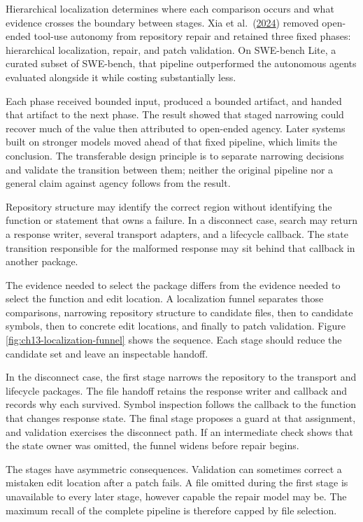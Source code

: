 Hierarchical localization determines where each comparison occurs and what evidence crosses the boundary between stages. Xia et al.~(\href{https://arxiv.org/abs/2407.01489}{2024}) removed open-ended tool-use autonomy from repository repair and retained three fixed phases: hierarchical localization, repair, and patch validation. On SWE-bench Lite, a curated subset of SWE-bench, that pipeline outperformed the autonomous agents evaluated alongside it while costing substantially less.

Each phase received bounded input, produced a bounded artifact, and handed that artifact to the next phase. The result showed that staged narrowing could recover much of the value then attributed to open-ended agency. Later systems built on stronger models moved ahead of that fixed pipeline, which limits the conclusion. The transferable design principle is to separate narrowing decisions and validate the transition between them; neither the original pipeline nor a general claim against agency follows from the result.

Repository structure may identify the correct region without identifying the function or statement that owns a failure. In a disconnect case, search may return a response writer, several transport adapters, and a lifecycle callback. The state transition responsible for the malformed response may sit behind that callback in another package.

The evidence needed to select the package differs from the evidence needed to select the function and edit location. A localization funnel separates those comparisons, narrowing repository structure to candidate files, then to candidate symbols, then to concrete edit locations, and finally to patch validation. Figure \ref{fig:ch13-localization-funnel} shows the sequence. Each stage should reduce the candidate set and leave an inspectable handoff.

In the disconnect case, the first stage narrows the repository to the transport and lifecycle packages. The file handoff retains the response writer and callback and records why each survived. Symbol inspection follows the callback to the function that changes response state. The final stage proposes a guard at that assignment, and validation exercises the disconnect path. If an intermediate check shows that the state owner was omitted, the funnel widens before repair begins.

The stages have asymmetric consequences. Validation can sometimes correct a mistaken edit location after a patch fails. A file omitted during the first stage is unavailable to every later stage, however capable the repair model may be. The maximum recall of the complete pipeline is therefore capped by file selection.

